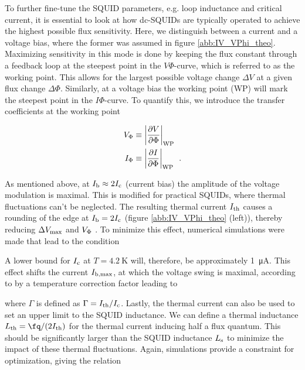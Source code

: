 To further fine-tune the SQUID parameters, e.g. loop inductance and critical current, it is essential to look at how dc-SQUIDs are typically operated to achieve the highest possible flux sensitivity. Here, we distinguish between a current and a voltage bias, where the former was assumed in figure \ref{abb:IV_VPhi_theo}. Maximizing sensitivity in this mode is done by keeping the flux constant through a feedback loop at the steepest point in the $V\Phi$-curve, which is referred to as the working point. This allows for the largest possible voltage change $\Delta V$ at a given flux change $\Delta \Phi$. Similarly, at a voltage bias the working point (WP) will mark the steepest point in the $I\Phi$-curve. To quantify this, we introduce the transfer coefficients at the working point

\begin{align}
V_{\rm \Phi} &\equiv {\left|\frac{\partial V}{\partial\Phi}\right|}_{\text{WP}} \\ I_{\rm \Phi} &\equiv {\left|\frac{\partial I}{\partial\Phi}\right|}_{\text{WP}} \ \ .
\end{align}

As mentioned above, at $I_{\rm b}\approx 2I_{\rm c}$ (current bias) the amplitude of the voltage modulation is maximal. This is modified for practical SQUIDs, where thermal fluctuations can't be neglected. The resulting thermal current $I_{\rm th}$ causes a rounding of the edge at $I_{\rm b}= 2I_{\rm c}$ (figure \ref{abb:IV_VPhi_theo} (left)), thereby reducing $\Delta V_{\rm max}$ and $V_{\rm \Phi}$ \cite{Ivanchenko1968}. To minimize this effect, numerical simulations were made that lead to the condition \cite{Clarke1988}


A lower bound for $I_{\rm c}$ at $T=\qty{4.2}{\kelvin}$ will, therefore, be approximately \qty{1}{\uA}. This effect shifts the current $I_{\rm b,max}$, at which the voltage swing is maximal, according to \cite{Drung1996} by a temperature correction factor leading to 


where $\Gamma$ is defined as $\Gamma=I_{\rm th}/I_{\rm c}$. Lastly, the thermal current can also be used to set an upper limit to the SQUID inductance. We can define a thermal inductance $L_{\rm th}= \unit{\fq}/({2I_{\rm th}})$ for the thermal current inducing half a flux quantum. This should be significantly larger than the SQUID inductance $L_{\rm s}$ to minimize the impact of these thermal fluctuations. Again, simulations provide a constraint for optimization, giving the relation \cite{Clarke1988}

